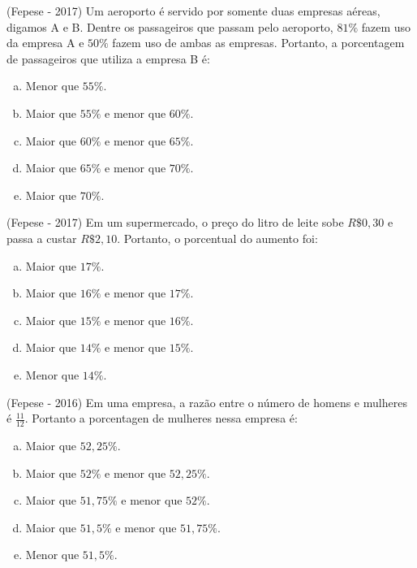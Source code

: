  \begin{exer}
 (Fepese - 2017) Um aeroporto é servido por somente duas empresas aéreas, digamos A e B. Dentre os passageiros que passam pelo aeroporto, $81\%$ fazem uso da empresa A e $50\%$ fazem uso de ambas as empresas. Portanto, a porcentagem de passageiros que utiliza a empresa B é:

  \begin{enumerate}[a)]
   \item Menor que $55\%$.
   \item Maior que $55\%$ e menor que $60\%$.
   \item Maior que $60\%$ e menor que $65\%$.
   \item Maior que $65\%$ e menor que $70\%$.
   \item Maior que $70\%$.
   \end{enumerate}
 \end{exer} 
 
 \begin{exer}
 (Fepese - 2017) Em um supermercado, o preço do litro de leite sobe $R\$ 0,30$ e passa a custar $R\$ 2,10$. Portanto, o porcentual do aumento foi:
    \begin{enumerate}[a)]
    \item Maior que $17\%$.
    \item Maior que $16\%$ e menor que $17\%$.
    \item Maior que $15\%$ e menor que $16\%$.
    \item Maior que $14\%$ e menor que $15\%$.
    \item Menor que $14\%$.
    \end{enumerate}
 \end{exer} 
 
 \begin{exer}
 (Fepese - 2016) Em uma empresa, a razão entre o número de homens e mulheres é $\frac{11}{12}$. Portanto a porcentagen de mulheres nessa empresa é:
    \begin{enumerate}[a)]
    \item Maior que $52,25\%$.
    \item Maior que $52\%$ e menor que $52,25\%$.
    \item Maior que $51,75\%$ e menor que $52\%$.
    \item Maior que $51,5\%$ e menor que $51,75\%$.
    \item Menor que $51,5\%$.
    \end{enumerate}
 \end{exer} 
 
